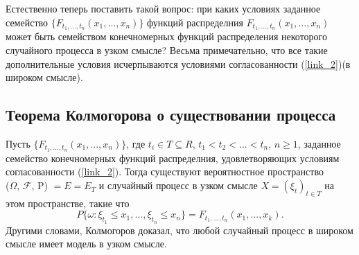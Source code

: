 Естественно теперь поставить такой вопрос: при каких условиях заданное семейство $\{F_{t_1, ... , t_n}(x_1, ... , x_n)\}$ функций распределния $F_{t_1, ... , t_n}(x_1, ... , x_n)$ может быть семейством конечномерных функций распределения некоторого случайного процесса в узком смысле? Весьма примечательно, что все такие дополнительные условия исчерпываются условиями согласованности (\ref{link_2})(в широком смысле).

\subsection{Теорема Колмогорова о существовании процесса}

\begin{theorem}
	Пусть $\{ F_{t_1, ... , t_n}(x_1, ... , x_n) \}$, где $t_i \in T \subseteq R$, $t_1 < t_2 < ... < t_n$, $n \geq 1$, заданное семейство конечномерных функций распределния, удовлетворяющих условиям согласованности (\ref{link_2}). Тогда существуют вероятностное пространство \\($\Omega$, $\mathscr{F}$, P) $=E=E_T$ и случайный процесс в узком смысле $X=(\xi_t)_{t \in T}$ на этом пространстве, такие что
	\begin{equation} \label{link_3}
	P\{\omega: \xi_{t_1} \leq x_1, ... ,\xi_{t_n} \leq x_n\} = F_{t_1, ... , t_n}(x_1, ... , x_k).
	\end{equation}
	Другими словами, Колмогоров доказал, что любой случайный процесс в широком смысле имеет модель в узком смысле.
\end{theorem}


